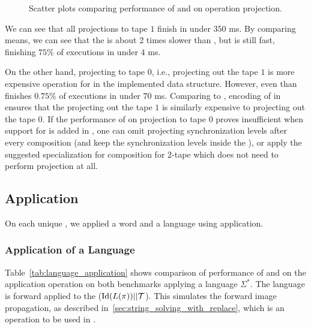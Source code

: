 \begin{figure}[ht]
    \centering
    \quad
    \caption{
      Scatter plots comparing performance of \mata and \mona on operation projection.
    }
    \label{fig:projection}%
\end{figure}

We can see that all projections to tape $1$ finish in under $350$ ms.
By comparing means, we can see that the \mata is about 2 times slower than \mona, but is still fast, finishing $75\%$ of executions in under $4$ ms.

On the other hand, projecting to tape $0$, i.e., projecting out the tape $1$ is more expensive operation for \mata in the implemented data structure.
However, even than \mata finishes $0.75\%$ of executions in under $70$ ms.
Comparing to \mona, encoding of \nfts in \mona ensures that the projecting out the tape $1$ is similarly expensive to projecting out the tape $0$.
If the performance of \mata on projection to tape $0$ proves insufficient when support for \nfts is added in \noodler, one can omit projecting synchronization levels after every composition (and keep the synchronization levels inside the \nft), or apply the suggested specialization for composition for $2$-tape \nfts which does not need to perform projection at all.

\subsection{Application}

On each unique \nft, we applied a word and a language using \nft application.

\subsubsection{Application of a Language}

Table~\ref{tab:language_application} shows comparison of performance of \mata and \mona on the application operation on both benchmarks applying a language $\Sigma^*$.
The language is forward applied to the \nft ($\text{Id}(L(\pi)) || \mathcal{T} $).
This simulates the forward image propagation, as described in~\ref{sec:string_solving_with_replace}, which is an operation to be used in \noodler.

